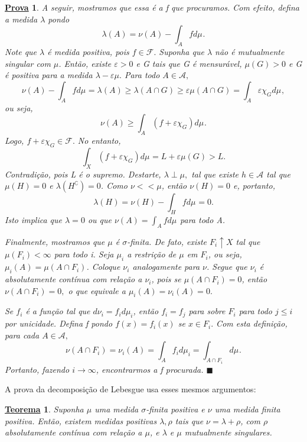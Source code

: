 \documentclass{article}
\newtheorem*{theorem*}{\underline{Teorema}}
\newtheorem*{proof*}{\underline{Prova}}
\renewcommand\qedsymbol{$\blacksquare$}
\begin{document}
\begin{proof*}
  A seguir, mostramos que essa é a f que procuramos. Com efeito, defina a medida \(\lambda \) pondo 
    \[
      \lambda (A) = \nu (A) - \int_{A}f d\mu_{}.
    \]
  Note que \(\lambda \) é medida positiva, pois \(f\in \mathcal{F}.\) Suponha que \(\lambda \) não é mutualmente singular com \(\mu \). Então, existe \(\varepsilon >0\) e G tais que G é mensurável, \(\mu (G) > 0\)
e G é positiva para a medida \(\lambda -\varepsilon \mu .\) Para todo \(A\in \mathcal{A},\)
  \[
    \nu (A) - \int_{A}f d\mu_{} = \lambda (A) \geq \lambda (A\cap G) \geq \varepsilon \mu (A\cap G) = \int_{A}\varepsilon \chi_{G} d\mu_{},
  \]
ou seja, 
  \[
    \nu (A) \geq \int_{A}(f+\varepsilon \chi_{G}) d\mu_{}.
  \]
  Logo, \(f+\varepsilon \chi_{G}\in \mathcal{F}.\) No entanto, 
    \[
      \int_{X}(f+\varepsilon \chi_{G}) d\mu_{} = L + \varepsilon \mu (G) > L.
    \]
  Contradição, pois L é o supremo. Destarte, \(\lambda \perp \mu ,\) tal que existe \(h\in \mathcal{A}\) tal que \(\mu (H) = 0\) e \(\lambda (H ^{\complement}) = 0\). Como \(\nu<<\mu \), então \(\nu (H) = 0\) e, portanto, 
    \[
      \lambda (H) = \nu (H) - \int_{H}f d\mu_{} = 0.
    \]
  Isto implica que \(\lambda  = 0\) ou que \(\nu (A) = \int_{A}f d\mu_{}\) para todo A.

  Finalmente, mostramos que \(\mu \) é \(\sigma \)-finita. De fato, existe \(F_{i}\uparrow X\) tal que \(\mu (F_{i}) < \infty\) para todo i. Seja \(\mu_{i}\) a restrição de \(\mu \) em \(F_{i}\), ou seja, \(\mu_{i}(A) = \mu(A\cap F_{i})\).
Coloque \(\nu_{i}\) analogamente para \(\nu \). Segue que \(\nu_{i}\) é absolutamente contínua com relação a \(\nu_{i}\), pois se \(\mu(A\cap F_{i}) = 0\), então \(\nu (A\cap F_{i})=0,\) o que equivale a \(\mu_{i}(A) = \nu_{i}(A) = 0.\) 

  Se \(f_{i}\) é a função tal que \(d\nu_{i} = f_{i}d\mu_{i}\), então \(f_{i} = f_{j}\) para sobre \(F_{i}\) para todo \(j\leq i\) por unicidade. Defina f pondo \(f(x) = f_{i}(x)\) se \(x\in F_{i}.\) Com esta definição, para cada \(A\in \mathcal{A},\) 
    \[
      \nu (A\cap F_{i}) = \nu_{i}(A) = \int_{A}f_{i} d\mu_{i} = \int_{A\cap F_{i}} d\mu_{}.
    \]
  Portanto, fazendo \(i\to \infty\), encontrarmos a f procurada. \qedsymbol
 \end{proof*}
 A prova da decomposição de Lebesgue usa esses mesmos argumentos: 
\begin{theorem*}
  Suponha \(\mu \) uma medida \(\sigma \)-finita positiva e \(\nu \) uma medida finita positiva. Então, existem medidas positivas \(\lambda , \rho \) tais que \(\nu = \lambda + \rho \), com \(\rho \) absolutamente contínua com relação a \(\mu \), e \(\lambda \) e \(\mu \) mutualmente singulares.
\end{theorem*}
\end{document}
